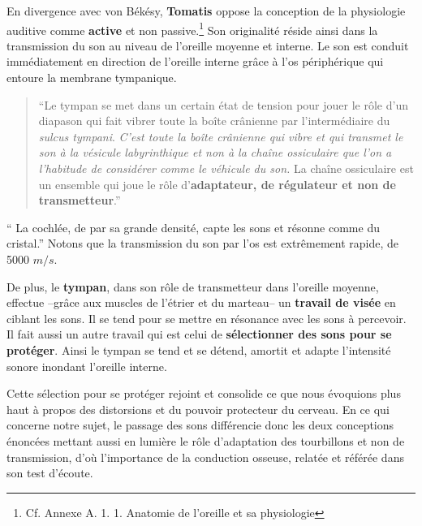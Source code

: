 En divergence avec von Békésy, \textbf{Tomatis} oppose la conception de la
physiologie auditive comme \textbf{active} et non
passive.\footnote{Cf. Annexe A. 1. 1. Anatomie de l'oreille et sa physiologie}
Son originalité réside ainsi dans la transmission du son
au niveau de l'oreille moyenne et interne. Le son est conduit immédiatement en direction de l'oreille 
interne grâce à l'os périphérique qui entoure la membrane tympanique.

\begin{quotation}
	``Le tympan se met dans un certain état de tension pour jouer le
	rôle d'un diapason qui fait vibrer toute la boîte crânienne
	par l'intermédiaire du \emph{sulcus tympani}.
	\emph{C'est toute la boîte crânienne qui vibre et qui transmet le son à
		la vésicule labyrinthique et non à la chaîne ossiculaire que l'on a l'habitude
		de considérer comme le véhicule du son.} La chaîne ossiculaire est un ensemble
	qui
	joue le rôle d'\textbf{adaptateur, de régulateur et non de transmetteur}.'' \autocite {tomatis_conf1972}

\end{quotation}
\enquote {	La cochlée, de par sa grande densité, capte les sons
	et résonne comme du cristal.}  \autocite {tomatis_conf1972}
Notons que la transmission du son par l'os est extrêmement rapide, de
5000 $m/s$.

De plus, le \textbf{tympan}, dans son rôle de transmetteur dans l'oreille
          moyenne, effectue --grâce aux muscles de l'étrier et du marteau--
		un\textbf{ travail de visée} en ciblant les sons. Il
se tend
		pour se mettre en résonance avec les sons à percevoir.
               Il fait aussi un autre travail qui est celui de \textbf{sélectionner des
sons
		pour se protéger}. Ainsi le tympan se tend et se détend,
              amortit et adapte
l'intensité
		sonore inondant  l'oreille interne.
		
		
Cette sélection pour se  protéger rejoint et consolide ce que nous évoquions plus haut à propos des 
distorsions et du pouvoir protecteur du cerveau.
En ce qui concerne notre sujet, le passage des sons différencie donc les deux conceptions énoncées 
mettant aussi en lumière  le rôle d'adaptation des tourbillons et non de transmission, 
d'où l'importance de  
la conduction osseuse, relatée et référée dans son test d'écoute.


